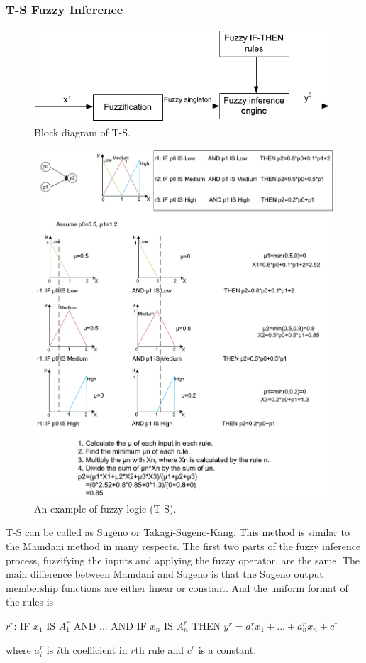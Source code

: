 \documentclass[journal,a4paper,onecolumn]{article}
\begin{document}
\subsubsection{T-S Fuzzy Inference}
\begin{figure}[!hbt]
	\begin{center}
		\includegraphics[width=0.5\columnwidth]{fig49}
		\caption{Block diagram of T-S.}
		\label{fig:Block diagram of T-S}
	\end{center}
\end{figure}
\begin{figure}[!hbt]
	\begin{center}
		\includegraphics[width=\columnwidth]{fuzzy_logic_example1}
		\caption{An example of fuzzy logic (T-S).}
		\label{fig:An example of fuzzy logic (T-S)}
	\end{center}
\end{figure}
T-S can be called as Sugeno or Takagi-Sugeno-Kang. This method is similar to the Mamdani method in many respects. The first two parts of the fuzzy inference process, fuzzifying the inputs and applying the fuzzy operator, are the same. The main difference between Mamdani and Sugeno is that the Sugeno output membership functions are either linear or constant. \cite{ts}
And the uniform format of the rules is
\begin{center}
	$r^r$: IF $x_1$ IS $A^r_1$ AND ... AND IF $x_n$ IS $A^r_n$ THEN $y^r=a^r_1x_1+...+a^r_nx_n+c^r$
\end{center}
where $a^r_i$ is $i$th coefficient in $r$th rule and $c^r$ is a constant. 
\end{document}
